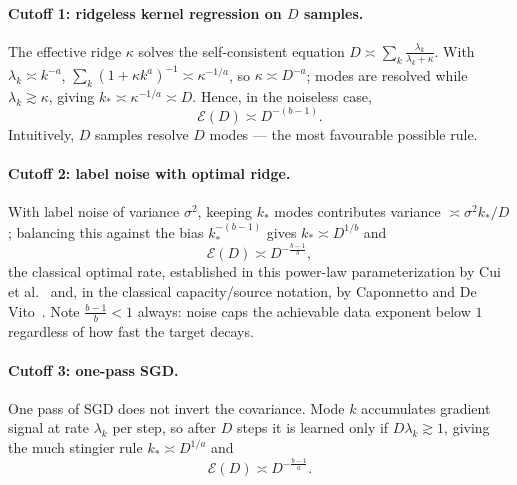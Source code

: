 \documentclass[11pt,a4paper]{article}
\theoremstyle{definition}
\begin{document}
\paragraph{Cutoff 1: ridgeless kernel regression on $D$ samples.} The effective ridge $\kappa$ solves the self-consistent equation $D \asymp \sum_k \frac{\lambda_k}{\lambda_k+\kappa}$. With $\lambda_k\asymp k^{-a}$, $\sum_k (1+\kappa k^a)^{-1}\asymp \kappa^{-1/a}$, so $\kappa\asymp D^{-a}$; modes are resolved while $\lambda_k \gtrsim \kappa$, giving $k_*\asymp \kappa^{-1/a}\asymp D$. Hence, in the noiseless case,
\begin{equation}
  \mathcal{E}(D)\asymp D^{-(b-1)} .
  \label{eq:krr-noiseless}
\end{equation}
Intuitively, $D$ samples resolve $D$ modes --- the most favourable possible rule.

\paragraph{Cutoff 2: label noise with optimal ridge.} With label noise of variance $\sigma^2$, keeping $k_*$ modes contributes variance $\asymp\sigma^2 k_*/D$; balancing this against the bias $k_*^{-(b-1)}$ gives $k_*\asymp D^{1/b}$ and
\begin{equation}
  \mathcal{E}(D)\asymp D^{-\frac{b-1}{b}},
  \label{eq:krr-noisy}
\end{equation}
the classical optimal rate, established in this power-law parameterization by Cui et al.~\cite{cui2021generalization} and, in the classical capacity/source notation, by Caponnetto and De Vito~\cite{caponnetto2007optimal}. Note $\frac{b-1}{b}<1$ always: noise caps the achievable data exponent below $1$ regardless of how fast the target decays.

\paragraph{Cutoff 3: one-pass SGD.} One pass of SGD does not invert the covariance. Mode $k$ accumulates gradient signal at rate $\lambda_k$ per step, so after $D$ steps it is learned only if $D\lambda_k\gtrsim 1$, giving the much stingier rule $k_*\asymp D^{1/a}$ and
\begin{equation}
  \mathcal{E}(D)\asymp D^{-\frac{b-1}{a}} .
  \label{eq:sgd-cutoff}
\end{equation}
\end{document}
